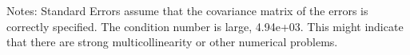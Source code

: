 Notes: \newline
 [1] Standard Errors assume that the covariance matrix of the errors is correctly specified. \newline
 [2] The condition number is large, 4.94e+03. This might indicate that there are \newline
 strong multicollinearity or other numerical problems.
